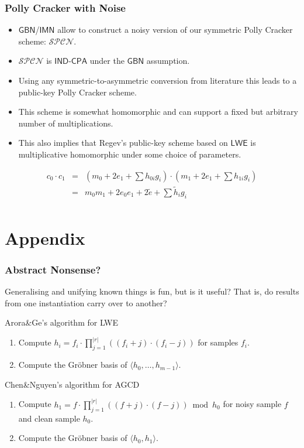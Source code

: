 \documentclass[10pt]{beamer}
\newcommand{\ideal}[1]{\langle {#1} \rangle}
\newcommand{\IND}{\mathsf{IND}}
\newcommand{\CPA}{\mathsf{CPA}}
\newcommand{\GBN}{\ensuremath{\mathsf{GBN}}\xspace}
\newcommand{\IMN}{\ensuremath{\mathsf{IMN}}\xspace}
\newcommand{\LWE}{\ensuremath{\mathsf{LWE}}\xspace}
\begin{document}
\begin{frame}
\frametitle{Polly Cracker with Noise}
\begin{itemize}
 \item \GBN/\IMN allow to construct a noisy version of our symmetric Polly Cracker scheme: $\mathcal{SPCN}$.
 \item $\mathcal{SPCN}$ is $\IND\mbox{-}\CPA$ under the \GBN assumption.
 \item Using any symmetric-to-asymmetric conversion from literature this leads to a public-key Polly Cracker scheme.
 \item This scheme is somewhat homomorphic and can support a fixed but arbitrary number of multiplications.
 \item This also implies that Regev's public-key scheme based on \LWE is multiplicative homomorphic under some choice of parameters.
\end{itemize}

\begin{eqnarray*}
c_0 \cdot c_1 &=& (m_0 + 2e_1 + \sum h_{0i}g_i) \cdot (m_1 + 2e_1 + \sum h_{1i}g_i)\\
              &=& m_0m_1 + 2e_0e_1 + 2\tilde{e} + \sum \tilde{h}_ig_i\\
\end{eqnarray*}
\end{frame}

\section{Appendix}

\begin{frame}
\frametitle{Abstract Nonsense?}

Generalising and unifying known things is fun, but is it useful? That is, do results from one instantiation carry over to another?

\vspace{1em}

\begin{block}{Arora\&Ge's algorithm for LWE} 
\begin{enumerate}
 \item Compute $h_i = f_i \cdot \prod_{j=1}^{|r|}\left((f_i+j)\cdot (f_i-j)\right)$ for samples $f_i$.
 \item Compute the Gröbner basis of $\ideal{h_0,\dots,h_{m-1}}$.
\end{enumerate}
\end{block}

\begin{block}{Chen\&Nguyen's algorithm for AGCD} 
\begin{enumerate}
 \item Compute $h_1 = f \cdot \prod_{j=1}^{|r|}\left((f+j)\cdot (f-j)\right) \bmod h_0$ for noisy sample $f$ and clean sample $h_0$.
 \item Compute the Gröbner basis of $\ideal{h_0,h_1}$.
\end{enumerate}
\end{block}

\end{frame}
\end{document}

